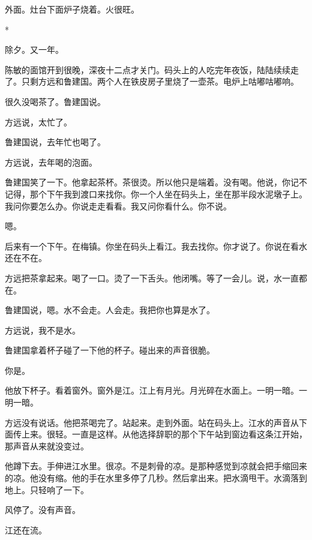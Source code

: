 \documentclass[UTF8,a5paper,11pt,openany]{ctexbook}
\newcommand{\scene}{\vspace{1em}\begin{center}*\quad*\quad*\end{center}\vspace{0.5em}}
\begin{document}
外面。灶台下面炉子烧着。火很旺。


\scene

除夕。又一年。

陈敏的面馆开到很晚，深夜十二点才关门。码头上的人吃完年夜饭，陆陆续续走了。只剩方远和鲁建国。两个人在铁皮房子里烧了一壶茶。电炉上咕嘟咕嘟响。

很久没喝茶了。鲁建国说。

方远说，太忙了。

鲁建国说，去年忙也喝了。

方远说，去年喝的泡面。

鲁建国笑了一下。他拿起茶杯。茶很烫。所以他只是端着。没有喝。他说，你记不记得，那个下午我到渡口来找你。你一个人坐在码头上，坐在那半段水泥墩子上。我问你要怎么办。你说走走看看。我又问你看什么。你不说。

嗯。

后来有一个下午。在梅镇。你坐在码头上看江。我去找你。你才说了。你说在看水还在不在。

方远把茶拿起来。喝了一口。烫了一下舌头。他闭嘴。等了一会儿。说，水一直都在。

鲁建国说，嗯。水不会走。人会走。我把你也算是水了。

方远说，我不是水。

鲁建国拿着杯子碰了一下他的杯子。碰出来的声音很脆。

你是。

他放下杯子。看着窗外。窗外是江。江上有月光。月光碎在水面上。一明一暗。一明一暗。

方远没有说话。他把茶喝完了。站起来。走到外面。站在码头上。江水的声音从下面传上来。很轻。一直是这样。从他选择辞职的那个下午站到窗边看这条江开始，那声音从来就没变过。

他蹲下去。手伸进江水里。很凉。不是刺骨的凉。是那种感觉到凉就会把手缩回来的凉。他没有缩。他的手在水里多停了几秒。然后拿出来。把水滴甩干。水滴落到地上。只轻响了一下。

风停了。没有声音。

江还在流。

\clearpage
\end{document}
